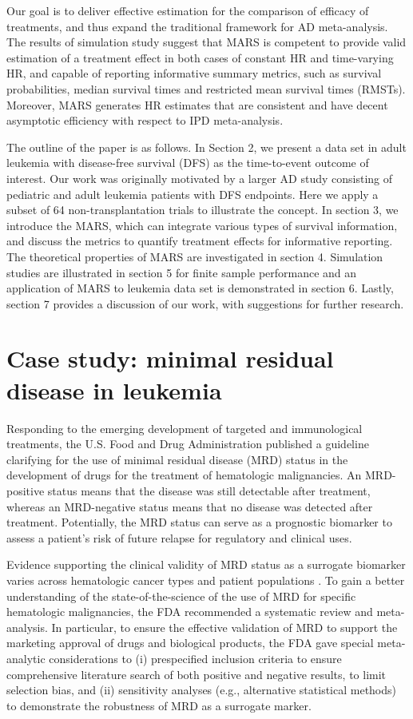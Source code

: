 \documentclass[12pt]{article}
\theoremstyle{mystyle}
\begin{document}
Our goal is to deliver effective estimation for the comparison of efficacy of treatments, and thus expand the traditional framework for AD meta-analysis.
The results of simulation study suggest that MARS is competent to provide valid estimation of a treatment effect in both cases of constant HR and time-varying HR, and capable of reporting informative summary metrics, such as survival probabilities, median survival times and restricted mean survival times (RMSTs). Moreover, MARS generates HR estimates that are consistent and have decent asymptotic efficiency with respect to IPD meta-analysis.

The outline of the paper is as follows.  In Section 2, we present a data set in adult leukemia with disease-free survival (DFS) as the time-to-event outcome of interest.  Our work was originally motivated by a larger AD study consisting of pediatric and adult leukemia patients with DFS endpoints. Here we apply a subset of 64 non-transplantation trials to illustrate the concept. In section 3, we introduce the MARS, which can integrate various types of survival information, and discuss the metrics to quantify treatment effects for informative reporting. The theoretical properties of MARS are investigated in section 4. Simulation studies are illustrated in section 5 for finite sample performance and an application of MARS to leukemia data set is demonstrated in section 6. Lastly, section 7 provides a discussion of our work, with suggestions for further research.


\section{Case study: minimal residual disease in leukemia}
\label{sec:2}

Responding to the emerging development of targeted and immunological treatments, the U.S. Food and Drug Administration \citep{us2019hematologic} published a guideline clarifying for the use of minimal residual disease (MRD) status in the development of drugs for the treatment of hematologic malignancies. An MRD-positive status means that the disease was still detectable after treatment, whereas an MRD-negative status means that no disease was detected after treatment. Potentially, the MRD status can serve as a prognostic biomarker to assess a patient’s risk of future relapse for regulatory and clinical uses. 

Evidence supporting the clinical validity of MRD status as a surrogate biomarker varies across hematologic cancer types and patient populations \citep{rach2016regulatory, Berry2017}. To gain a better understanding of the state-of-the-science of the use of MRD for specific hematologic malignancies, the FDA recommended a systematic review and meta-analysis. In particular, to ensure the effective validation of MRD to support the marketing approval of drugs and biological products, the FDA gave special meta-analytic considerations to (i) prespecified inclusion criteria to ensure comprehensive literature search of both positive and negative results, to limit selection bias, and (ii) sensitivity analyses (e.g., alternative statistical methods) to demonstrate the robustness of MRD as a surrogate marker.  
\end{document}
